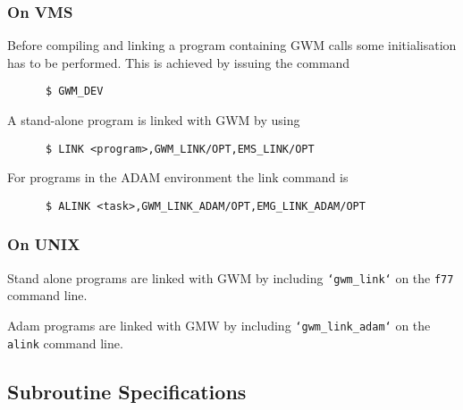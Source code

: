 \subsubsection{On VMS}
Before compiling and linking a program containing GWM calls some
initialisation has to be performed. This is achieved by issuing
the command
\begin{verbatim}
      $ GWM_DEV
\end{verbatim}

A stand-alone program is linked with GWM by using
\begin{verbatim}
      $ LINK <program>,GWM_LINK/OPT,EMS_LINK/OPT
\end{verbatim}

For programs in the ADAM environment the link command is
\begin{verbatim}
      $ ALINK <task>,GWM_LINK_ADAM/OPT,EMG_LINK_ADAM/OPT
\end{verbatim}

\subsubsection{On UNIX} 
Stand alone programs are linked with GWM by including
{\tt `gwm\_link`} on the {\tt f77} command line.

Adam programs are linked with GMW by including {\tt `gwm\_link\_adam`} on the
{\tt alink} command line.

\newpage
\subsection{Subroutine Specifications}

\newlength{\sstbannerlength}
\newlength{\sstcaptionlength}

\newcommand{\sstroutine}[3]{
   \goodbreak
   \rule{\textwidth}{0.5mm}
   \vspace{-7ex}
   \newline
   \settowidth{\sstbannerlength}{{\Large {\bf #1}}}
   \setlength{\sstcaptionlength}{\textwidth}
   \addtolength{\sstbannerlength}{0.5em}
   \addtolength{\sstcaptionlength}{-2.0\sstbannerlength}
   \addtolength{\sstcaptionlength}{-4.45pt}
   \parbox[t]{\sstbannerlength}{\flushleft{\Large {\bf #1}}}
   \parbox[t]{\sstcaptionlength}{\center{\Large #2}}
   \parbox[t]{\sstbannerlength}{\flushright{\Large {\bf #1}}}
   \begin{description}
      #3
   \end{description}
}

